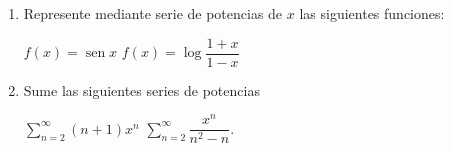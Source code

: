 \begin{enumerate}
\item Represente mediante serie de potencias de $x$ las siguientes funciones:
%
\setcontadoralph
\begin{centrar}
\nitem $f(x) =\operatorname{sen} x$\hfill
\nitem $f(x) =\log\dfrac{1+x}{1-x}$
\end{centrar}
%
\item
Sume las siguientes series de potencias
\setcontadoralph
\begin{centrar}
\nitem
$\displaystyle\sum_{n=2}^\infty   (n+1)x^n$\hfill
\nitem
$\displaystyle\sum_{n=2}^\infty   \dfrac{x^n}{n^2-n}$.
\end{centrar}

\end{enumerate}

%
%

\endinput
